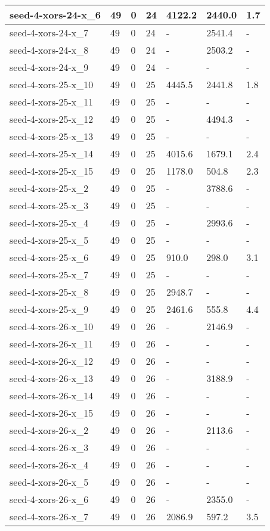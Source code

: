 \begin{scriptsize}
\begin{longtable}{|p{5cm}|l|l|l|l|l|l|}
seed-4-xors-24-x\_6&49&0&24&4122.2&2440.0&1.7 \\ \hline 
seed-4-xors-24-x\_7&49&0&24&-&2541.4&- \\ \hline 
seed-4-xors-24-x\_8&49&0&24&-&2503.2&- \\ \hline 
seed-4-xors-24-x\_9&49&0&24&-&-&- \\ \hline 
seed-4-xors-25-x\_10&49&0&25&4445.5&2441.8&1.8 \\ \hline 
seed-4-xors-25-x\_11&49&0&25&-&-&- \\ \hline 
seed-4-xors-25-x\_12&49&0&25&-&4494.3&- \\ \hline 
seed-4-xors-25-x\_13&49&0&25&-&-&- \\ \hline 
seed-4-xors-25-x\_14&49&0&25&4015.6&1679.1&2.4 \\ \hline 
seed-4-xors-25-x\_15&49&0&25&1178.0&504.8&2.3 \\ \hline 
seed-4-xors-25-x\_2&49&0&25&-&3788.6&- \\ \hline 
seed-4-xors-25-x\_3&49&0&25&-&-&- \\ \hline 
seed-4-xors-25-x\_4&49&0&25&-&2993.6&- \\ \hline 
seed-4-xors-25-x\_5&49&0&25&-&-&- \\ \hline 
seed-4-xors-25-x\_6&49&0&25&910.0&298.0&3.1 \\ \hline 
seed-4-xors-25-x\_7&49&0&25&-&-&- \\ \hline 
seed-4-xors-25-x\_8&49&0&25&2948.7&-&- \\ \hline 
seed-4-xors-25-x\_9&49&0&25&2461.6&555.8&4.4 \\ \hline 
seed-4-xors-26-x\_10&49&0&26&-&2146.9&- \\ \hline 
seed-4-xors-26-x\_11&49&0&26&-&-&- \\ \hline 
seed-4-xors-26-x\_12&49&0&26&-&-&- \\ \hline 
seed-4-xors-26-x\_13&49&0&26&-&3188.9&- \\ \hline 
seed-4-xors-26-x\_14&49&0&26&-&-&- \\ \hline 
seed-4-xors-26-x\_15&49&0&26&-&-&- \\ \hline 
seed-4-xors-26-x\_2&49&0&26&-&2113.6&- \\ \hline 
seed-4-xors-26-x\_3&49&0&26&-&-&- \\ \hline 
seed-4-xors-26-x\_4&49&0&26&-&-&- \\ \hline 
seed-4-xors-26-x\_5&49&0&26&-&-&- \\ \hline 
seed-4-xors-26-x\_6&49&0&26&-&2355.0&- \\ \hline 
seed-4-xors-26-x\_7&49&0&26&2086.9&597.2&3.5 \\ \hline 

\end{longtable}
\end{scriptsize}
